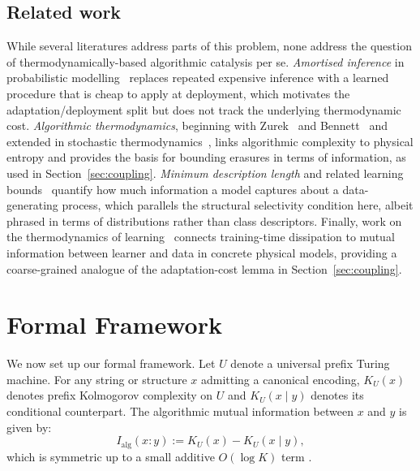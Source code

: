 \documentclass[runningheads]{llncs}
\newcommand{\MutInfo}{I_{\mathrm{alg}}}
\begin{document}
\subsection{Related work}
While several literatures address parts of this problem, none address the question of thermodynamically-based algorithmic catalysis per se. \emph{Amortised inference} in probabilistic modelling~\cite{stuhlmuller2013amortized,kingma2013autoencoding,rezende2014stochastic} replaces repeated expensive inference with a learned procedure that is cheap to apply at deployment, which motivates the adaptation/deployment split but does not track the underlying thermodynamic cost. \emph{Algorithmic thermodynamics}, beginning with Zurek~\cite{zurek1989algorithmic} and Bennett~\cite{bennett1982thermodynamics,bennett1998information} and extended in stochastic thermodynamics~\cite{parrondo2015thermodynamics,wolpert2019stochastic}, links algorithmic complexity to physical entropy and provides the basis for bounding erasures in terms of information, as used in Section~\ref{sec:coupling}. \emph{Minimum description length} and related learning bounds~\cite{rissanen1978modeling,grunwald2007minimum,mcallester1999pacbayes} quantify how much information a model captures about a data-generating process, which parallels the structural selectivity condition here, albeit phrased in terms of distributions rather than class descriptors. Finally, work on the thermodynamics of learning~\cite{still2012thermodynamics,goldt2017stochastic} connects training-time dissipation to mutual information between learner and data in concrete physical models, providing a coarse-grained analogue of the adaptation-cost lemma in Section~\ref{sec:coupling}. 

\section{Formal Framework}
\label{sec:framework}
We now set up our formal framework. Let $U$
denote a universal prefix Turing machine. For any string or structure
$x$ admitting a canonical encoding, $K_U(x)$ denotes prefix
Kolmogorov complexity on $U$ and $K_U(x\mid y)$ denotes its
conditional counterpart. The algorithmic mutual information between
$x$ and $y$ is given by:
\begin{equation}
\label{eq:mutinfo}
\MutInfo(x:y):=K_U(x)-K_U(x\mid y),
\end{equation}
which is symmetric up to a small additive $O(\log K)$ term \cite{li2019kolmogorov,kolmogorov1965three,solomonoff1964formal,levin1984randomness}. 
\end{document}
